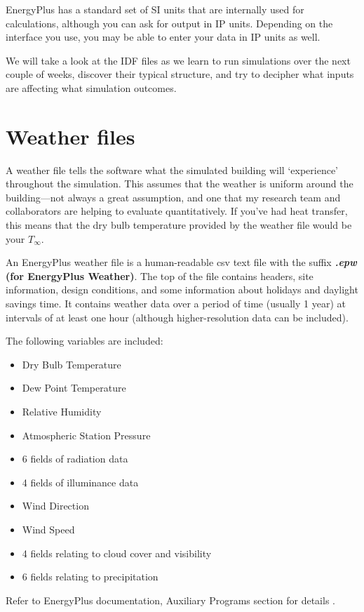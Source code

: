 \documentclass[10pt]{article}
\begin{document}
EnergyPlus has a standard set of SI units that are internally used for calculations, although you can ask for output in IP units. Depending on the interface you use, you may be able to enter your data in IP units as well.

We will take a look at the IDF files as we learn to run simulations over the next couple of weeks, discover their typical structure, and try to decipher what inputs are affecting what simulation outcomes.


\section{Weather files}

A weather file tells the software what the simulated building will `experience' throughout the simulation. This assumes that the weather is uniform around the building---not always a great assumption, and one that my research team and collaborators are helping to evaluate quantitatively. If you've had heat transfer, this means that the dry bulb temperature provided by the weather file would be your $T_\infty$. 

An EnergyPlus weather file is a human-readable csv text file with the suffix \textbf{\textit{.epw} (for EnergyPlus Weather)}. The top of the file contains headers, site information, design conditions, and some information about holidays and daylight savings time. It contains weather data over a period of time (usually 1 year) at intervals of at least one hour (although higher-resolution data can be included). 


The following variables are included:
\begin{itemize}
    \item Dry Bulb Temperature
    \item Dew Point Temperature
    \item  Relative Humidity
    \item  Atmospheric Station Pressure
    \item 6 fields of radiation data
    \item 4 fields of illuminance data
    \item Wind Direction
    \item  Wind Speed
    \item 4 fields relating to cloud cover and visibility
    \item 6 fields relating to precipitation
\end{itemize}

Refer to EnergyPlus documentation, Auxiliary Programs section for details \cite{EP9docs}.
\end{document}
